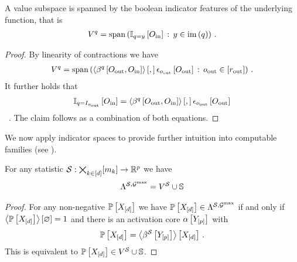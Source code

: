 \begin{lemma}
    A value subspace is spanned by the boolean indicator features of the underlying function, that is
    \begin{align*}
        V^{q}
        = \mathrm{span}\left(\mathbb{I}_{q=y}\left[O_{\mathrm{in}}\right] \, : \, y\in\mathrm{im}\left(q\right)\right) \, .
    \end{align*}
\end{lemma}
\begin{proof}
    By linearity of contractions we have
    \begin{align*}
        V^{q} = \mathrm{span}\left(
            \left\langle \beta^{q}\left[O_{\mathrm{out}},O_{\mathrm{in}}\right]\right\rangle \left[ , \right] \epsilon_{o_{\mathrm{out}}}\left[O_{\mathrm{out}}\right]
            \,:\, o_{\mathrm{out}} \in [r_{\mathrm{out}}]
        \right) \, .
    \end{align*}
    It further holds that
    \begin{align*}
        \mathbb{I}_{q=I_{o_{\mathrm{out}}}}\left[O_{\mathrm{in}}\right]
        = \left\langle \beta^{q}\left[O_{\mathrm{out}},O_{\mathrm{in}}\right]\right\rangle \left[ , \right] \epsilon_{o_{\mathrm{out}}}\left[O_{\mathrm{out}}\right]
    \end{align*} \, .
    The claim follows as a combination of both equations.
\end{proof}






We now apply indicator spaces to provide further intuition into computable families (see ).


\begin{lemma}
    For any statistic $\mathcal{S} : \bigtimes_{k\in[d]}[m_{k}]\rightarrow\mathbb{R}^{p}$ we have
    \begin{align*}
        \Lambda^{\mathcal{S},\mathcal{G}^{\mathrm{max}}} = V^{\mathcal{S}} \cup \mathbb{S}
    \end{align*}
\end{lemma}
\begin{proof}
    For any non-negative $\mathbb{P}\left[X_{[d]}\right]$ we have $\mathbb{P}\left[X_{[d]}\right]\in\Lambda^{\mathcal{S},\mathcal{G}^{\mathrm{max}}}$ if and only if $\left\langle \mathbb{P}\left[X_{[d]}\right]\right\rangle \left[ \varnothing \right]=1$ and there is an activation core $\alpha\left[Y_{[p]}\right]$ with
    \begin{align*}
        \mathbb{P}\left[X_{[d]}\right] = \left\langle \beta^{\mathcal{S}}\left[Y_{[p]}\right]\right\rangle \left[ X_{[d]} \right] \, .
    \end{align*}
    This is equivalent to $\mathbb{P}\left[X_{[d]}\right]\in V^{\mathcal{S}} \cup \mathbb{S}$.
\end{proof}

